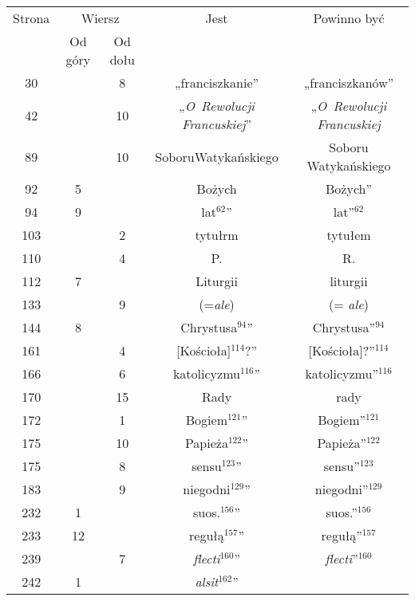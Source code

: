 \documentclass[a4paper,11pt]{article}
\numberwithin{equation}{section}
\begin{document}
\begin{center}

  \begin{tabular}{|c|c|c|c|c|}
    \hline
    Strona & \multicolumn{2}{c|}{Wiersz} & Jest
                              & Powinno być \\ \cline{2-3}
    & Od góry & Od dołu & & \\
    \hline
    \hphantom{0}30 & & \hphantom{0}8 & „franciszkanie” & „franciszkanów” \\
    \hphantom{0}42 & & 10 & „\textit{O~Rewolucji Francuskiej}”
    & „\textit{O~Rewolucji Francuskiej} \\
    \hphantom{0}89 & & 10 & SoboruWatykańskiego & Soboru Watykańskiego \\
    \hphantom{0}92 & \hphantom{0}5 & & Bożych & Bożych” \\
    \hphantom{0}94 & \hphantom{0}9 & & lat$^{ 62 }$” & lat”$^{ 62 }$ \\
    103 & & \hphantom{0}2 & tytułrm & tytułem \\
    110 & & \hphantom{0}4 & P. & R. \\
    112 & \hphantom{0}7 & & Liturgii & liturgii \\
    133 & & \hphantom{0}9 & (=\textit{ale}) & (= \textit{ale}) \\
    144 & \hphantom{0}8 & & Chrystusa$^{ 94 }$” & Chrystusa”$^{ 94 }$\\
    161 & & \hphantom{0}4 & [Kościoła]$^{ 114 }$?” & [Kościoła]?”$^{ 114 }$ \\
    166 & & \hphantom{0}6 & katolicyzmu$^{ 116 }$” & katolicyzmu”$^{ 116 }$ \\
    170 & & 15 & Rady & rady \\
    172 & & \hphantom{0}1 & Bogiem$^{ 121 }$” & Bogiem”$^{ 121 }$ \\
    175 & & 10 & Papieża$^{ 122 }$” & Papieża”$^{ 122 }$ \\
    175 & & \hphantom{0}8 & sensu$^{ 123 }$” & sensu”$^{ 123 }$ \\
    183 & & \hphantom{0}9 & niegodni$^{ 129 }$” & niegodni”$^{ 129 }$ \\
    232 & \hphantom{0}1 & & suos.$^{ 156 }$” & suos.”$^{ 156 }$ \\
    233 & 12 & & regułą$^{ 157 }$” & regułą”$^{ 157 }$ \\
    239 & & \hphantom{0}7 & \textit{flecti}$^{ 160 }$”
    & \textit{flecti}”$^{ 160 }$ \\
    242 & \hphantom{0}1 & & \textit{alsit}$^{ 162 }$”

\end{tabular}
\end{center}
\end{document}
